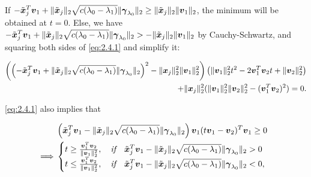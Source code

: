 If $-\tilde{\boldsymbol x}_j^T\boldsymbol v_1+\lVert\tilde{\boldsymbol x}_j\rVert_2\sqrt{c(\lambda_0-\lambda_1)}\lVert\boldsymbol\gamma_{\lambda_0}\rVert_2\geq \lVert\tilde{\boldsymbol x}_j\rVert_2\lVert\boldsymbol v_1\rVert_2$, the minimum will be obtained at $t=0$. Else, we have $-\tilde{\boldsymbol x}_j^T\boldsymbol v_1+\lVert\tilde{\boldsymbol x}_j\rVert_2\sqrt{c(\lambda_0-\lambda_1)}\lVert\boldsymbol\gamma_{\lambda_0}\rVert_2>- \lVert\tilde{\boldsymbol x}_j\rVert_2\lVert\boldsymbol v_1\rVert_2$ by Cauchy-Schwartz, and squaring both sides of \eqref{eq:2.4.1} and simplify it:

\begin{gather}
    \begin{aligned}
        \left(\left(-\tilde{\boldsymbol x}_j^T\boldsymbol v_1+\lVert\tilde{\boldsymbol x}_j\rVert_2\sqrt{c(\lambda_0-\lambda_1)}\lVert\boldsymbol\gamma_{\lambda_0}\rVert_2\right)^2-\lVert\boldsymbol x_j\rVert_2^2\lVert\boldsymbol v_1\rVert_2^2\right)\left(\lVert\boldsymbol v_1\rVert_2^2t^2-2\boldsymbol v_1^T\boldsymbol v_2 t+\lVert\boldsymbol v_2\rVert_2^2\right)\\
        +\lVert\boldsymbol x_j\rVert_2^2(\lVert\boldsymbol v_1\rVert_2^2\lVert\boldsymbol v_2\rVert_2^2-(\boldsymbol v_1^T\boldsymbol v_2)^2)=0.
    \end{aligned}
\end{gather}

\eqref{eq:2.4.1} also implies that

\begin{gather}
    \begin{aligned}
        &\left(\tilde{\boldsymbol x}_j^T\boldsymbol v_1-\lVert\tilde{\boldsymbol x}_j\rVert_2\sqrt{c(\lambda_0-\lambda_1)}\lVert\boldsymbol\gamma_{\lambda_0}\rVert_2\right)\boldsymbol v_1(t\boldsymbol v_1-\boldsymbol v_2)^T\boldsymbol v_1\geq 0\\
        \implies&\begin{cases}
        t\geq\frac{\boldsymbol v_1^T\boldsymbol v_2}{\lVert\boldsymbol v_1\rVert_2^2},\quad \textit{if}\quad\tilde{\boldsymbol x}_j^T\boldsymbol v_1-\lVert\tilde{\boldsymbol x}_j\rVert_2\sqrt{c(\lambda_0-\lambda_1)}\lVert\boldsymbol\gamma_{\lambda_0}\rVert_2 >0\\
        t\leq\frac{\boldsymbol v_1^T\boldsymbol v_2}{\lVert\boldsymbol v_1\rVert_2^2},\quad \textit{if}\quad\tilde{\boldsymbol x}_j^T\boldsymbol v_1-\lVert\tilde{\boldsymbol x}_j\rVert_2\sqrt{c(\lambda_0-\lambda_1)}\lVert\boldsymbol\gamma_{\lambda_0}\rVert_2<0,
        \end{cases}
    \end{aligned}
\end{gather}

